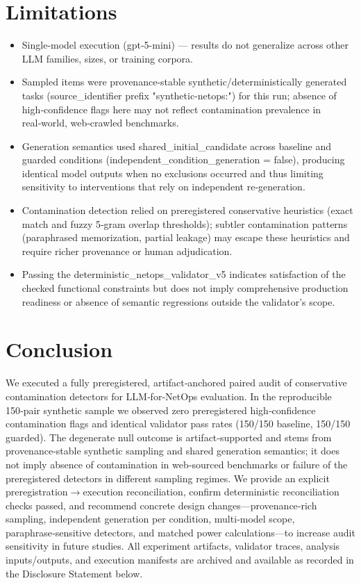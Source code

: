 \documentclass[conference]{IEEEtran}
\begin{document}
\section{Limitations}
\begin{itemize}
\item Single‑model execution (gpt‑5-mini) --- results do not generalize across other LLM families, sizes, or training corpora.
\item Sampled items were provenance‑stable synthetic/deterministically generated tasks (source\_identifier prefix "synthetic-netops:") for this run; absence of high‑confidence flags here may not reflect contamination prevalence in real‑world, web‑crawled benchmarks.
\item Generation semantics used shared\_initial\_candidate across baseline and guarded conditions (independent\_condition\_generation = false), producing identical model outputs when no exclusions occurred and thus limiting sensitivity to interventions that rely on independent re‑generation.
\item Contamination detection relied on preregistered conservative heuristics (exact match and fuzzy 5‑gram overlap thresholds); subtler contamination patterns (paraphrased memorization, partial leakage) may escape these heuristics and require richer provenance or human adjudication.
\item Passing the deterministic\_netops\_validator\_v5 indicates satisfaction of the checked functional constraints but does not imply comprehensive production readiness or absence of semantic regressions outside the validator's scope.
\end{itemize}

\section{Conclusion}
We executed a fully preregistered, artifact‑anchored paired audit of conservative contamination detectors for LLM‑for‑NetOps evaluation. In the reproducible 150‑pair synthetic sample we observed zero preregistered high‑confidence contamination flags and identical validator pass rates (150/150 baseline, 150/150 guarded). The degenerate null outcome is artifact‑supported and stems from provenance‑stable synthetic sampling and shared generation semantics; it does not imply absence of contamination in web‑sourced benchmarks or failure of the preregistered detectors in different sampling regimes. We provide an explicit preregistration\ensuremath{\rightarrow}execution reconciliation, confirm deterministic reconciliation checks passed, and recommend concrete design changes---provenance‑rich sampling, independent generation per condition, multi‑model scope, paraphrase‑sensitive detectors, and matched power calculations---to increase audit sensitivity in future studies. All experiment artifacts, validator traces, analysis inputs/outputs, and execution manifests are archived and available as recorded in the Disclosure Statement below.
\end{document}
